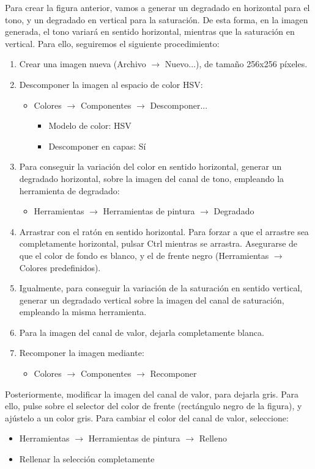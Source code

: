 \documentclass[es,practica]{uah}
\begin{document}
Para crear la figura anterior, vamos a generar un degradado en horizontal para el tono, y un degradado en vertical para la saturación. De esta forma, en la imagen generada, el tono variará en sentido horizontal, mientras que la saturación en vertical. Para ello, seguiremos el siguiente procedimiento:

\begin{enumerate}
	\item Crear una imagen nueva (Archivo $\rightarrow$ Nuevo...), de tamaño 256x256 píxeles.
	\item Descomponer la imagen al espacio de color HSV:
	\begin{itemize}
		\item Colores $\rightarrow$ Componentes $\rightarrow$ Descomponer...
		\begin{itemize}
			\item Modelo de color: HSV
			\item Descomponer en capas: Sí
		\end{itemize}
	\end{itemize}
	\item Para conseguir la variación del color en sentido horizontal, generar un degradado horizontal, sobre la imagen del canal de tono, empleando la herramienta de degradado:
	\begin{itemize}
		\item Herramientas $\rightarrow$ Herramientas de pintura $\rightarrow$ Degradado
	\end{itemize}
	\item Arrastrar con el ratón en sentido horizontal. Para forzar a que el arrastre sea completamente horizontal, pulsar Ctrl mientras se arrastra. Asegurarse de que el color de fondo es blanco, y el de frente negro (Herramientas $\rightarrow$ Colores predefinidos).
	\item Igualmente, para conseguir la variación de la saturación en sentido vertical, generar un degradado vertical sobre la imagen del canal de saturación, empleando la misma herramienta.
	\item Para la imagen del canal de valor, dejarla completamente blanca.
	\item Recomponer la imagen mediante:
	\begin{itemize}
		\item Colores $\rightarrow$ Componentes $\rightarrow$ Recomponer
	\end{itemize}
\end{enumerate}

Posteriormente, modificar la imagen del canal de valor, para dejarla gris. Para ello, pulse sobre el selector del color de frente (rectángulo negro de la figura), y ajústelo a un color gris. Para cambiar el color del canal de valor, seleccione:
\begin{itemize}
	\item Herramientas $\rightarrow$ Herramientas de pintura $\rightarrow$ Relleno
	\item Rellenar la selección completamente
\end{itemize}
\end{document}
